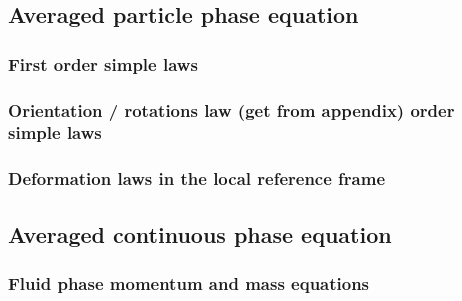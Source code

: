 \documentclass[11pt]{My_preprint}
\begin{document}
\subsection{Averaged particle phase equation}
\subsubsection{First order simple laws}
\subsubsection{Orientation / rotations law (get from appendix) order simple laws}
\subsubsection{Deformation laws in the local reference frame}

\subsection{Averaged continuous phase equation}
\subsubsection{Fluid phase momentum and mass equations}
\label{sec:Exemples}

% 
% 
% 
% 


% 
% 
% 

% 


% 
% 
\end{document}
